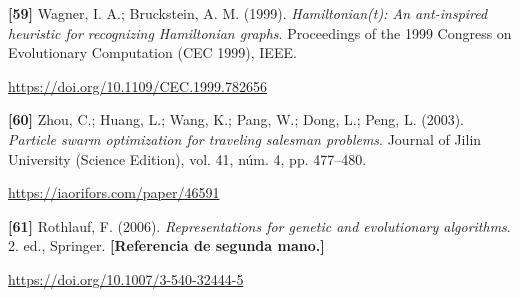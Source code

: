 \documentclass[11pt,a4paper]{article}
\newcommand{\referencia}[1]{\par\addvspace{0.8\baselineskip}\noindent\hangindent=1.1cm\hangafter=1 #1\par\nopagebreak}
\begin{document}
\begin{samepage}
\referencia{\textbf{[59]} Wagner, I. A.; Bruckstein, A. M. (1999). \textit{Hamiltonian(t): An ant-inspired heuristic for recognizing {Hamiltonian} graphs}. Proceedings of the 1999 Congress on Evolutionary Computation ({CEC} 1999), IEEE.}
 {\small\url{https://doi.org/10.1109/CEC.1999.782656}}\par
\end{samepage}
\begin{samepage}
\referencia{\textbf{[60]} Zhou, C.; Huang, L.; Wang, K.; Pang, W.; Dong, L.; Peng, L. (2003). \textit{Particle swarm optimization for traveling salesman problems}. Journal of Jilin University (Science Edition), vol. 41, núm. 4, pp. 477--480.}
 {\small\url{https://iaorifors.com/paper/46591}}\par
\end{samepage}
\begin{samepage}
\referencia{\textbf{[61]} Rothlauf, F. (2006). \textit{Representations for genetic and evolutionary algorithms}. 2. ed., Springer. \textbf{[Referencia de segunda mano.]}}
 {\small\url{https://doi.org/10.1007/3-540-32444-5}}\par
\end{samepage}
\end{document}
